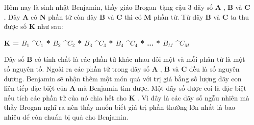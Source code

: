 Hôm nay là sinh nhật Benjamin, thầy giáo Brogan tặng cậu 3 dãy số   \textbf{    A   }   ,   \textbf{    B   }   và   \textbf{    C   }   . Dãy   \textbf{    A   }   có   \textbf{    N   }   phần tử còn dãy   \textbf{    B   }   và   \textbf{    C   }   thì có   \textbf{    M   }   phần tử. Từ dãy   \textbf{    B   }   và   \textbf{    C   }   ta thu được số   \textbf{    K   }   như sau:  

\textbf{    K = $B_{1}$    ^$C_{1}$    * $B_{2}$    ^$C_{2}$    * $B_{3}$    ^$C_{3}$    * $B_{4}$    ^$C_{4}$    * ... * $B_{M}$    ^$C_{M}$}

   Dãy số   \textbf{    B   }   có tính chất là các phần tử khác nhau đôi một và mỗi phân tử là một số nguyên tố. Ngoài ra các phần tử trong dãy số   \textbf{    A   }   ,   \textbf{    B   }   và   \textbf{    C   }   đều là số nguyên dương. Benjamin sẽ nhận thêm một món quà với trị giá bằng số lượng dãy con liên tiếp đặc biệt của   \textbf{    A   }   mà Benjamin tìm được. Một dãy số được coi là đặc biệt nếu tích các phần tử của nó chia hết cho   \textbf{    K   }   . Vì đây là các dãy số ngẫu nhiên mà thầy Brogan nghĩ ra nên thầy muốn biết giá trị phần thưởng lớn nhất là bao nhiêu để còn chuẩn bị quà cho Benjamin.